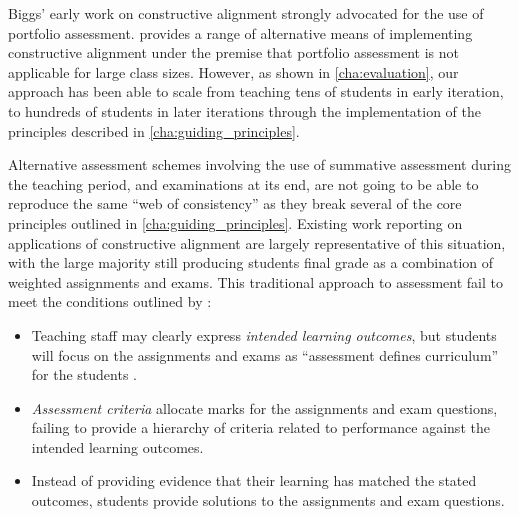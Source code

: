 Biggs' early work on constructive alignment \cite{Biggs:1996c,Biggs:1999} strongly advocated for the use of portfolio assessment. \citet{Biggs:2007} provides a range of alternative means of implementing constructive alignment under the premise that portfolio assessment is not applicable for large class sizes. However, as shown in \cref{cha:evaluation}, our approach has been able to scale from teaching tens of students in early iteration, to hundreds of students in later iterations through the implementation of the principles described in \cref{cha:guiding_principles}.

Alternative assessment schemes involving the use of summative assessment during the teaching period, and examinations at its end, are not going to be able to reproduce the same ``web of consistency'' as they break several of the core principles outlined in \cref{cha:guiding_principles}. Existing work reporting on applications of constructive alignment are largely representative of this situation, with the large majority still producing students final grade as a combination of weighted assignments and exams. This traditional approach to assessment fail to meet the conditions outlined by \citet{Biggs:1996c}:

\begin{itemize}[noitemsep,nolistsep]
	\item Teaching staff may clearly express \emph{intended learning outcomes}, but students will focus on the assignments and exams as ``assessment defines curriculum'' for the students \cite{Ramsden:1992}.
	\item \emph{Assessment criteria} allocate marks for the assignments and exam questions, failing to provide a hierarchy of criteria related to performance against the intended learning outcomes.
	\item Instead of providing evidence that their learning has matched the stated outcomes, students provide solutions to the assignments and exam questions. 
\end{itemize}


